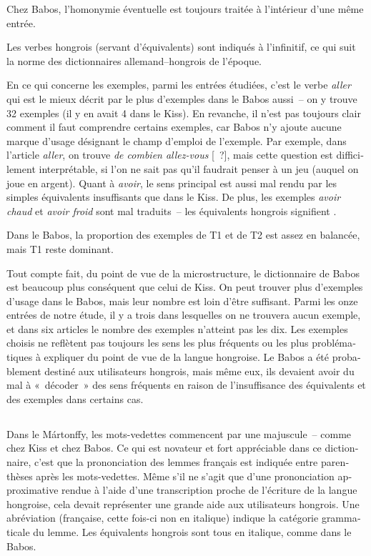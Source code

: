 \documentclass[output=paper,colorlinks,citecolor=brown,arabicfont,chinesefont,booklanguage=french]{langscibook}
\begin{document}
\begin{otherlanguage}{french}
Chez Babos, l’homonymie éventuelle est toujours traitée à l’intérieur d’une même entrée.

Les verbes hongrois (servant d’équivalents) sont indiqués à l’infinitif, ce qui suit la norme des dictionnaires allemand–hongrois de l’époque.

En ce qui concerne les exemples, parmi les entrées étudiées, c’est le verbe \emph{aller} qui est le mieux décrit par le plus d’exemples dans le Babos aussi~-- on y trouve 32 exemples (il y en avait 4 dans le Kiss). En revanche, il n’est pas toujours clair comment il faut comprendre certains exemples, car Babos n’y ajoute aucune marque d’usage désignant le champ d’emploi de l’exemple. Par exemple, dans l’article \emph{aller}, on trouve \emph{de combien allez-vous} [~?], mais cette question est difficilement interprétable, si l’on ne sait pas qu’il faudrait penser à un jeu (auquel on joue en argent). Quant à \emph{avoir}, le sens principal  est aussi mal rendu par les simples équivalents insuffisants que dans le Kiss. De plus, les exemples \emph{avoir chaud} et \emph{avoir froid} sont mal traduits~-- les équivalents hongrois signifient .

Dans le Babos, la proportion des exemples de T1 et de T2 est assez en balancée, mais T1 reste dominant.

Tout compte fait, du point de vue de la microstructure, le dictionnaire de Babos est beaucoup plus conséquent que celui de Kiss. On peut trouver plus d’exemples d’usage dans le Babos, mais leur nombre est loin d’être suffisant. Parmi les onze entrées de notre étude, il y a trois dans lesquelles on ne trouvera aucun exemple, et dans six articles le nombre des exemples n’atteint pas les dix. Les exemples choisis ne reflètent pas toujours les sens les plus fréquents ou les plus problématiques à expliquer du point de vue de la langue hongroise. Le Babos a été probablement destiné aux utilisateurs hongrois, mais même eux, ils devaient avoir du mal à «~décoder~» des sens fréquents en raison de l’insuffisance des équivalents et des exemples dans certains cas.

\subsection{\citealt{Martonffy1879} }\label{sec:tillinger:3.3}

Dans le Mártonffy, les mots-vedettes commencent par une majuscule~-- comme chez Kiss et chez Babos. Ce qui est novateur et fort appréciable dans ce dictionnaire, c’est que la prononciation des lemmes français est indiquée entre parenthèses après les mots-vedettes. Même s’il ne s’agit que d’une prononciation approximative rendue à l’aide d’une transcription proche de l’écriture de la langue hongroise, cela devait représenter une grande aide aux utilisateurs hongrois. Une abréviation (française, cette fois-ci non en italique) indique la catégorie grammaticale du lemme. Les équivalents hongrois sont tous en italique, comme dans le Babos. 


\end{otherlanguage}
\end{document}
